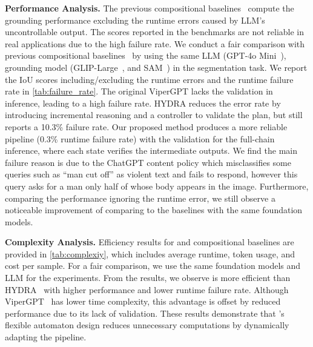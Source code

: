 \noindent\textbf{Performance Analysis.} The previous compositional baselines~\cite{suris_vipergpt_2023, ke_hydra_2024} compute the grounding performance excluding the runtime errors caused by LLM's uncontrollable output. The scores reported in the benchmarks are not reliable in real applications due to the high failure rate. We conduct a fair comparison with previous compositional baselines~\cite{ke_hydra_2024, suris_vipergpt_2023} by using the same LLM (GPT-4o Mini~\cite{openai_gpt-4o_2024}), grounding model (GLIP-Large~\cite{li_grounded_2022}, and SAM~\cite{kirillov_segment_2023}) in the segmentation task. We report the IoU scores including/excluding the runtime errors and the runtime failure rate in  \autoref{tab:failure_rate}. The original ViperGPT lacks the validation in inference, leading to a high failure rate. %
HYDRA reduces the error rate by introducing incremental reasoning and a controller to validate the plan, but still reports a 10.3\% failure rate. Our proposed method \methodname{} produces a more reliable pipeline (0.3\% runtime failure rate) with the validation for the full-chain inference, where each state verifies the intermediate outputs. We find the main failure reason is due to the ChatGPT content policy which misclassifies some queries such as ``man cut off'' as violent text and fails to %
respond, however this query asks for a man only half of whose body appears in the image. Furthermore, comparing the performance ignoring the runtime error, we still observe a noticeable improvement of \methodname{} comparing to the baselines with the same foundation models.

\noindent\textbf{Complexity Analysis.} Efficiency results for \methodname{} and compositional baselines are provided in \autoref{tab:complexiy}, which includes average runtime, token usage, and cost per sample. For a fair comparison, we use the same foundation models and LLM for the experiments. From the results, we observe \methodname{} is more efficient than HYDRA~\cite{ke_hydra_2024} with higher performance and lower runtime failure rate. Although ViperGPT~\cite{suris_vipergpt_2023} has lower time complexity, this advantage is offset by reduced performance due to its lack of validation. These results demonstrate that \methodname{}'s flexible automaton design reduces unnecessary computations by dynamically adapting the pipeline. 




